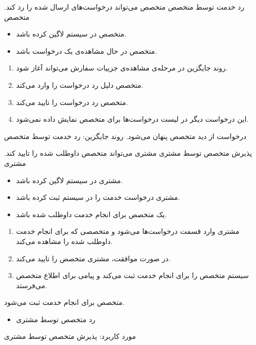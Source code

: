 \alternativeflow
{
	رد خدمت توسط متخصص
}
{}
{
	متخصص می‌تواند درخواست‌های ارسال شده را رد کند.
}
{
	متخصص
}
{}
{
	\begin{itemize}
		\vspace*{-0.6cm}
		\item 
		متخصص در سیستم لاگین کرده باشد.
		\item
		متخصص در حال مشاهده‌ی یک درخواست باشد.
	\end{itemize}
}
{
	\vspace*{-0.6cm}
	\begin{enumerate}
		\item 
		روند جایگزین در مرحله‌ی مشاهده‌ی جزییات سفارش می‌تواند آغاز شود.
		\item
		متخصص دلیل رد درخواست را وارد می‌کند.
		\item
		متخصص رد درخواست را تایید می‌کند.
		\item
		این درخواست دیگر در لیست درخواست‌ها برای متخصص نمایش داده نمی‌شود.
	\end{enumerate}
}
{
	درخواست از دید متخصص پنهان می‌شود.
}
{
روند جایگزین: رد خدمت توسط متخصص
}


\usecase
{پذیرش متخصص توسط مشتری}
{}
{مشتری می‌تواند متخصص داوطلب شده را تایید کند.}
{مشتری}
{}
{	
	\begin{itemize}
		\vspace*{-0.6cm}
		\item 
		مشتری در سیستم لاگین کرده باشد.
		\item
		مشتری درخواست خدمت را در سیستم ثبت کرده باشد.
		\item
		یک متخصص برای انجام خدمت داوطلب شده باشد.
	\end{itemize}
}
{
	\vspace*{-0.6cm}
	\begin{enumerate}
		\item 
		مشتری وارد قسمت درخواست‌ها می‌شود و متخصصی که برای انجام خدمت داوطلب شده را مشاهده می‌کند.
		\item 
		در صورت موافقت، مشتری متخصص را تایید می‌کند.
		\item 
		سیستم متخصص را برای انجام خدمت ثبت می‌کند و پیامی برای اطلاع متخصص می‌فرستد.
	\end{enumerate}
}
{متخصص برای انجام خدمت ثبت می‌شود.}
{
	\begin{itemize}
		\vspace*{-0.6cm}
		\item
		رد متخصص توسط مشتری
	\end{itemize}
}
{
	مورد کاربرد: پذیرش متخصص توسط مشتری
}

